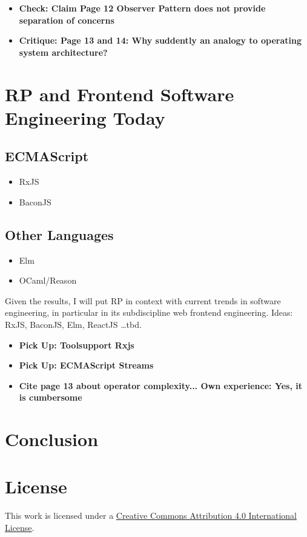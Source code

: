 \documentclass[12pt,a4paper]{article}
\begin{document}
\begin{itemize}
	\item \textbf{Check: Claim Page 12 Observer Pattern does not provide separation of concerns}
	\item \textbf{Critique: Page 13 and 14: Why suddently an analogy to operating system architecture?}
\end{itemize}

\section{RP and Frontend Software Engineering Today}

\subsection{ECMAScript}

\begin{itemize}
	\item RxJS
	\item BaconJS
\end{itemize}

\subsection{Other Languages}

\begin{itemize}
	\item Elm
	\item OCaml/Reason
\end{itemize}

Given the results, I will put RP in context with current trends in software engineering, in particular in its subdiscipline web frontend engineering.
Ideas: RxJS, BaconJS, Elm, ReactJS \dots tbd.

\begin{itemize}
	\item \textbf{Pick Up: Toolsupport Rxjs}
	\item \textbf{Pick Up: ECMAScript Streams}
	\item \textbf{Cite page 13 about operator complexity... Own experience: Yes, it is cumbersome}
\end{itemize}


\section{Conclusion}





\section*{License}
\ccby\thinspace\thinspace This work is licensed under a \href{https://creativecommons.org/licenses/by/4.0/}{Creative Commons Attribution 4.0 International License}.
\end{document}
